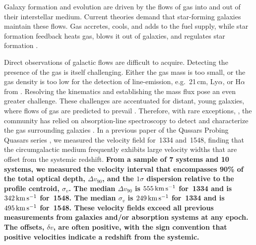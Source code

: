 \documentclass[iop]{emulateapj}
\begin{document}
Galaxy formation and evolution are driven by the flows of gas into and out of their interstellar
medium. Current theories demand that star-forming galaxies maintain these flows. Gas accretes,
cools, and adds to the fuel supply, while star formation feedback heats gas, blows it out of
galaxies, and regulates star formation \citep[for a review see][]{SomervilleDave15}.

Direct observations of galactic flows are difficult to acquire. Detecting the presence of
the gas is itself challenging. Either the gas mass is too small, or the gas density is too low for
the detection of line-emission, e.g.\ 21\,cm, Ly$\alpha$, or H$\alpha$ from . Resolving
the kinematics and establishing the mass flux pose an even greater challenge. These challenges are
accentuated for distant, young galaxies, where flows of gas are predicted to prevail
\citep{Keres+09,Fumagalli+11}. Therefore, with rare exceptions,
\citep[e.g.][]{Cantalupo+14,Hennawi+15}, the community has relied on absorption-line spectroscopy
to detect and characterize the gas surrounding galaxies
\citep[e.g.][]{BergeronBoisse91,Steidel+10,Prochaska+11,Tumlinson+13}.
In a previous paper of the Qussars Probing Quasars series \citep[][, hereafter QPQ8]{QPQ8}, we
measured the velocity field for \,1334 and \,1548, finding that the
circumgalactic medium frequently exhibits large velocity widths that are offset from the systemic
redshift.
{\bf From a sample of 7  systems and 10 
systems, we measured the velocity interval that encompasses 90\% of the total optical depth,
$\Delta v_{90}$, and the $1\sigma$ dispersion relative to the profile centroid, $\sigma_v$.
The median $\Delta v_{90}$ is $555\,{\rm km\,s^{-1}}$ for \,1334 and is
$342\,{\rm km\,s^{-1}}$ for \,1548. The median $\sigma_v$ is $249\,{\rm km\,s^{-1}}$ for
\,1334 and is $495\,{\rm km\,s^{-1}}$ for \,1548. These velocity fields exceed
all previous measurements from galaxies and/or absorption systems at any epoch.
The offsets, $\delta v$, are often positive, with the sign convention that positive
velocities indicate a redshift from the systemic.
}
\end{document}
